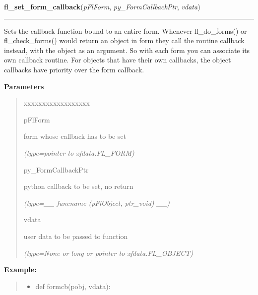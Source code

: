 \hspace{.8\funcindent}\begin{boxedminipage}{\funcwidth}

    \raggedright \textbf{fl\_set\_form\_callback}(\textit{pFlForm}, \textit{py\_FormCallbackPtr}, \textit{vdata})

    \vspace{-1.5ex}

    \rule{\textwidth}{0.5\fboxrule}
\setlength{\parskip}{2ex}
    Sets the callback function bound to an entire form. Whenever 
    fl\_do\_forms() or fl\_check\_forms() would return an object in form 
    they call the routine callback instead, with the object as an argument.
    So with each form you can associate its own callback routine. For 
    objects that have their own callbacks, the object callbacks have 
    priority over the form callback.

\setlength{\parskip}{1ex}
      \textbf{Parameters}
      \vspace{-1ex}

      \begin{quote}
        \begin{Ventry}{xxxxxxxxxxxxxxxxxx}

          \item[pFlForm]

          form whose callback has to be set

            {\it (type=pointer to xfdata.FL\_FORM)}

          \item[py\_FormCallbackPtr]

          python callback to be set, no return

            {\it (type=\_\_ funcname (pFlObject, ptr\_void) \_\_)}

          \item[vdata]

          user data to be passed to function

            {\it (type=None or long or pointer to xfdata.FL\_OBJECT)}

        \end{Ventry}

      \end{quote}

\textbf{Example:}
\begin{quote}
  \begin{itemize}

  \item
    \setlength{\parskip}{0.6ex}
def formcb(pobj, vdata):




\end{itemize}
\end{quote}
\end{boxedminipage}
